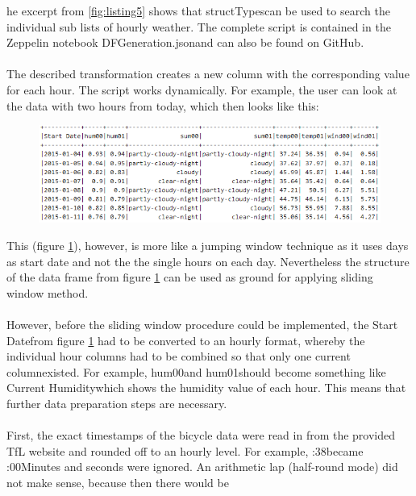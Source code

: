 he excerpt from \ref{fig:listing5} shows that \glqq structTypes\grqq can be used to search the individual sub lists
of \glqq hourly weather\grqq .
The complete script is contained in the Zeppelin notebook \glqq DFGeneration.json\grqq and can also be found on GitHub.
\\\\
The described transformation creates a new column with the corresponding value for each hour.
The script works dynamically. For example, the user can look at the data with two hours from today,
which then looks like this:
\begin{figure}[H]
\hspace{-1.6cm}
\includegraphics[width=1.2\textwidth]{img/figure7_weather_df}\label{fig:figure7_weather_df}
\label{fig:figure7_weather_df}
\end{figure}
This (figure \ref{fig:figure7_weather_df}), however, is more like a jumping window technique as it uses days as start date
and not the the single hours on each day. Nevertheless the structure of the data frame from figure \ref{fig:figure7_weather_df} can be used as ground for applying sliding window method.\\\\
However, before the sliding window procedure could be implemented, the \glqq Start Date\grqq from figure \ref{fig:figure7_weather_df} had to be converted to an hourly format, whereby the individual hour columns had to be
combined so that only one \glqq current column\grqq existed. For example, \glqq hum00\grqq and \glqq hum01\grqq should
become something like \glqq Current Humidity\grqq  which shows the humidity value of each hour. This
means that further data preparation steps are necessary.\\\\
First, the exact timestamps of the bicycle data were read in from the provided TfL website and
rounded off to an hourly level. For example, :38\grqq became :00\grqq  Minutes and seconds were
ignored. An arithmetic lap (half-round mode) did not make sense, because then there would be

